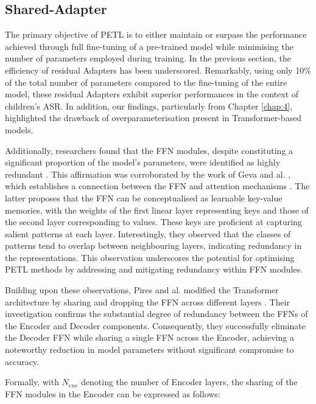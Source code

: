 \subsection{Shared-Adapter}
The primary objective of \ac{PETL} is to either maintain or surpass the performance achieved through full fine-tuning of a pre-trained model while minimising the number of parameters employed during training. In the previous section, the efficiency of residual Adapters has been underscored. Remarkably, using only 10\% of the total number of parameters compared to the fine-tuning of the entire model, these residual Adapters exhibit superior performances in the context of children's \ac{ASR}. In addition, our findings, particularly from Chapter \ref{chap:4},  highlighted the drawback of overparameterisation present in Transformer-based models.

Additionally, researchers found that the \ac{FFN} modules, despite constituting a significant proportion of the model's parameters, were identified as highly redundant \cite{pires2023one}. This affirmation was corroborated by the work of Geva and al. , which establishes a connection between the \ac{FFN} and attention mechanisms \cite{geva2020transformer}. The latter proposes that the \ac{FFN} can be conceptualised as learnable key-value memories, with the weights of the first linear layer representing keys and those of the second layer corresponding to values. These keys are proficient at capturing salient patterns at each layer. Interestingly, they observed that the classes of patterns tend to overlap between neighbouring layers, indicating redundancy in the representations. This observation underscores the potential for optimising \ac{PETL} methods by addressing and mitigating redundancy within \ac{FFN} modules.

Building upon these observations, Pires and al. modified the Transformer architecture by sharing and dropping the \ac{FFN} across different layers \cite{pires2023one}. Their investigation confirms the substantial degree of redundancy between the \acp{FFN} of the Encoder and Decoder components. Consequently, they successfully eliminate the Decoder \ac{FFN} while sharing a single \ac{FFN} across the Encoder, achieving a noteworthy reduction in model parameters without significant compromise to accuracy.

Formally, with $N_{enc}$ denoting the number of Encoder layers, the sharing of the \ac{FFN} modules in the Encoder can be expressed as follows:

